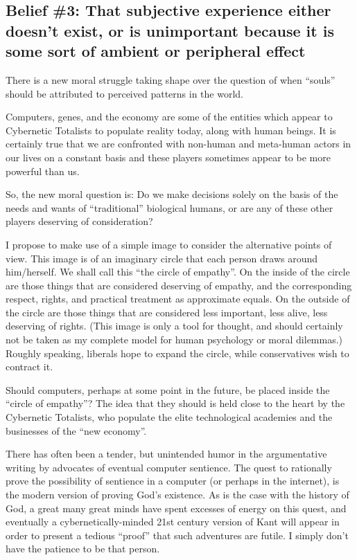 \documentclass[letterpaper,12pt,english]{sphinxmanual}
\begin{document}
\subsection{Belief \#3: \textbf{That subjective experience either doesn't exist, or is unimportant because it is some sort of ambient or peripheral effect}}
\label{lanier:belief-3-that-subjective-experience-either-doesn-t-exist-or-is-unimportant-because-it-is-some-sort-of-ambient-or-peripheral-effect}
There is a new moral struggle taking shape over the question of when ``souls'' should be attributed to perceived patterns in the world.

Computers, genes, and the economy are some of the entities which appear to Cybernetic Totalists to populate reality today, along with human beings. It is certainly true that we are confronted with non-human and meta-human actors in our lives on a constant basis and these players sometimes appear to be more powerful than us.

So, the new moral question is: Do we make decisions solely on the basis of the needs and wants of ``traditional'' biological humans, or are any of these other players deserving of consideration?

I propose to make use of a simple image to consider the alternative points of view. This image is of an imaginary circle that each person draws around him/herself. We shall call this ``the circle of empathy''. On the inside of the circle are those things that are considered deserving of empathy, and the corresponding respect, rights, and practical treatment as approximate equals. On the outside of the circle are those things that are considered less important, less alive, less deserving of rights. (This image is only a tool for thought, and should certainly not be taken as my complete model for human psychology or moral dilemmas.) Roughly speaking, liberals hope to expand the circle, while conservatives wish to contract it.

Should computers, perhaps at some point in the future, be placed inside the ``circle of empathy''? The idea that they should is held close to the heart by the Cybernetic Totalists, who populate the elite technological academies and the businesses of the ``new economy''.

There has often been a tender, but unintended humor in the argumentative writing by advocates of eventual computer sentience. The quest to rationally prove the possibility of sentience in a computer (or perhaps in the internet), is the modern version of proving God's existence. As is the case with the history of God, a great many great minds have spent excesses of energy on this quest, and eventually a cybernetically-minded 21st century version of Kant will appear in order to present a tedious ``proof'' that such adventures are futile. I simply don't have the patience to be that person.
\end{document}

